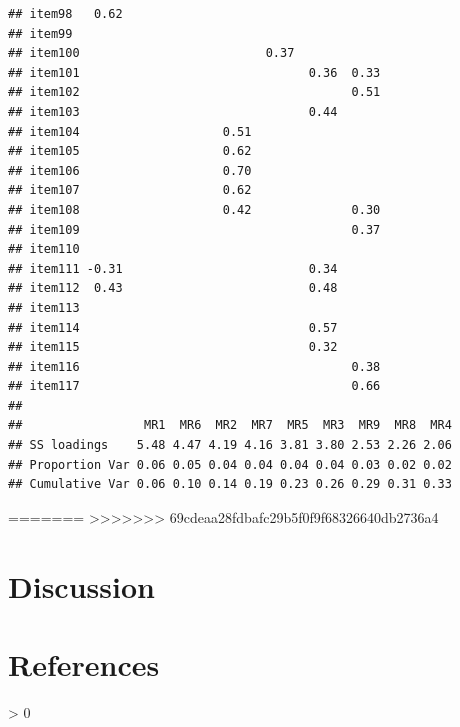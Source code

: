 \documentclass[
  english,
  man]{apa6}
\newlength{\cslhangindent}
\newenvironment{CSLReferences}[2] %
 {%
  \setlength{\parindent}{0pt}
  \ifodd #1 \everypar{\setlength{\hangindent}{\cslhangindent}}\ignorespaces\fi
  \ifnum #2 > 0
  \setlength{\parskip}{#2\baselineskip}
  \fi
 }%
 {}
\begin{document}
\begin{verbatim}
## item98   0.62                                                
## item99                                                       
## item100                          0.37                        
## item101                                0.36  0.33            
## item102                                      0.51            
## item103                                0.44                  
## item104                    0.51                              
## item105                    0.62                              
## item106                    0.70                              
## item107                    0.62                              
## item108                    0.42              0.30            
## item109                                      0.37            
## item110                                                      
## item111 -0.31                          0.34                  
## item112  0.43                          0.48                  
## item113                                                      
## item114                                0.57                  
## item115                                0.32                  
## item116                                      0.38            
## item117                                      0.66            
## 
##                 MR1  MR6  MR2  MR7  MR5  MR3  MR9  MR8  MR4
## SS loadings    5.48 4.47 4.19 4.16 3.81 3.80 2.53 2.26 2.06
## Proportion Var 0.06 0.05 0.04 0.04 0.04 0.04 0.03 0.02 0.02
## Cumulative Var 0.06 0.10 0.14 0.19 0.23 0.26 0.29 0.31 0.33
\end{verbatim}

=======
>>>>>>> 69cdeaa28fdbafc29b5f0f9f68326640db2736a4
\hypertarget{discussion}{%
\section{Discussion}\label{discussion}}

\newpage

\hypertarget{references}{%
\section{References}\label{references}}

\begingroup
\setlength{\parindent}{-0.5in}
\setlength{\leftskip}{0.5in}

\hypertarget{refs}{}
\begin{CSLReferences}{0}{0}
\end{CSLReferences}

\endgroup
\end{document}
